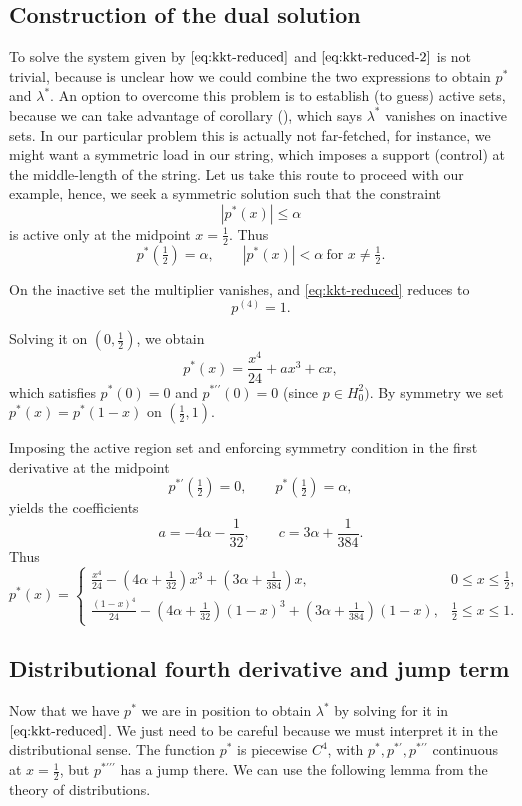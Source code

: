\documentclass[11pt,a4paper]{article}
\begin{document}
\subsection{Construction of the dual solution}
To solve the system given by $\ref{eq:kkt-reduced}$ and $\ref{eq:kkt-reduced-2}$ is not trivial, because is unclear how we could combine the two expressions to obtain $p^*$ and $\lambda^*$. An option to overcome this problem is to establish (to guess) active sets, because we can take advantage of corollary (), which says $\lambda^*$ vanishes on inactive sets. In our particular problem this is actually not far-fetched, for instance, we might want a symmetric load in our string, which imposes a support (control) at the middle-length of the string. Let us take this route to proceed with our example, hence, we seek a symmetric solution such that the constraint
\[
|p^*(x)| \le \alpha
\]
is active only at the midpoint $x=\tfrac12$.
Thus
\[
p^*\!\left(\tfrac12\right)=\alpha,
\qquad
|p^*(x)|<\alpha \ \text{for } x\neq \tfrac12.
\]

On the inactive set the multiplier vanishes, and
\eqref{eq:kkt-reduced} reduces to
\[
p^{(4)} = 1.
\]

Solving it on $(0,\tfrac12)$, we obtain
\[
p^*(x) = \frac{x^4}{24} + a x^3 + c x,
\]
which satisfies $p^*(0)=0$ and $p^{*\prime\prime}(0)=0$ (since $p \in H_0^2)$.
By symmetry we set $p^*(x)=p^*(1-x)$ on $(\tfrac12,1)$.

Imposing the active region set and enforcing symmetry condition in the first derivative at the midpoint
\[
p^{*\prime}\!\left(\tfrac12\right)=0,
\qquad
p^*\!\left(\tfrac12\right)=\alpha,
\]
yields the coefficients
\[
a = -4\alpha-\frac{1}{32},
\qquad
c = 3\alpha+\frac{1}{384}.
\]
Thus
\[
p^*(x)
=
\begin{cases}
\displaystyle
\frac{x^4}{24}
-\left(4\alpha+\frac{1}{32}\right)x^3
+\left(3\alpha+\frac{1}{384}\right)x,
& 0 \le x \le \tfrac12, \\[1.2em]
\displaystyle
\frac{(1-x)^4}{24}
-\left(4\alpha+\frac{1}{32}\right)(1-x)^3
+\left(3\alpha+\frac{1}{384}\right)(1-x),
& \tfrac12 \le x \le 1.
\end{cases}
\]



\subsection*{Distributional fourth derivative and jump term}
Now that we have $p^*$ we are in position to obtain $\lambda^*$ by solving for it in $\ref{eq:kkt-reduced}$. We just need to be careful because we must interpret it in the distributional sense.
The function $p^*$ is piecewise $C^4$,
with $p^*,p^{*\prime},p^{*\prime\prime}$ continuous at $x=\tfrac12$,
but $p^{*\prime\prime\prime}$ has a jump there. We can use the following lemma from the theory of distributions.
\end{document}

